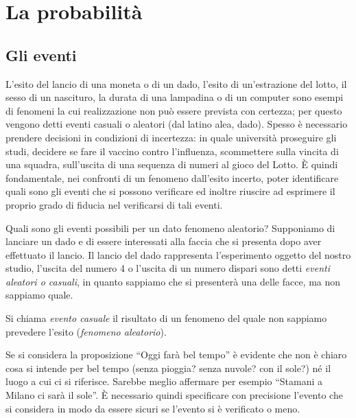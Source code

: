


\chapter{La probabilità}

\section{Gli eventi}
\label{sec:09_eventi}

L'esito del lancio di una moneta o di un dado, l'esito di un'estrazione del 
lotto, il sesso di un nascituro, la durata di una lampadina o di un 
computer sono esempi di fenomeni la cui realizzazione non può essere 
prevista con certezza; per questo vengono detti eventi casuali o aleatori 
(dal latino alea, dado). 
Spesso è necessario prendere decisioni in condizioni di incertezza: in quale 
università proseguire gli studi, decidere se fare il vaccino contro 
l'influenza, scommettere sulla vincita di una squadra, sull'uscita di una 
sequenza di numeri al gioco del Lotto. 
È quindi fondamentale, nei confronti di un fenomeno dall'esito incerto, 
poter identificare quali sono gli eventi che si possono verificare ed 
inoltre riuscire ad esprimere il proprio grado di fiducia nel verificarsi di 
tali eventi.

Quali sono gli eventi possibili per un dato fenomeno aleatorio? 
Supponiamo di lanciare un dado e di essere interessati alla faccia che si 
presenta dopo aver effettuato il lancio. 
Il lancio del dado rappresenta l'esperimento oggetto 
del nostro studio, l'uscita del numero 4 o l'uscita di un numero dispari 
sono detti \emph{eventi aleatori o casuali}, in quanto sappiamo che si 
presenterà una delle facce, ma non sappiamo quale.

\begin{definizione}
Si chiama \emph{evento casuale} il risultato di un fenomeno del quale non 
sappiamo prevedere l'esito (\emph{fenomeno aleatorio}).
\end{definizione}

Se si considera la proposizione ``Oggi farà bel tempo'' è evidente che non 
è chiaro cosa si intende per bel tempo (senza pioggia? senza nuvole? con il 
sole?) né il luogo a cui ci si riferisce. 
Sarebbe meglio affermare per esempio ``Stamani a Milano ci sarà il sole''. 
È necessario quindi specificare con precisione l'evento che si considera in 
modo da essere sicuri se l'evento si è verificato o meno.


